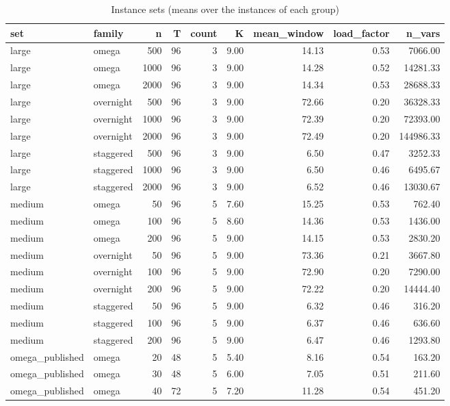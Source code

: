 \begin{table}[htbp]
\centering
\small
\caption{Instance sets (means over the instances of each group)}
\label{tab:instance_sets}
\begin{tabular}{llrrrrrrr}
\toprule
set & family & n & T & count & K & mean\_window & load\_factor & n\_vars \\
\midrule
large & omega & 500 & 96 & 3 & 9.00 & 14.13 & 0.53 & 7066.00 \\
large & omega & 1000 & 96 & 3 & 9.00 & 14.28 & 0.52 & 14281.33 \\
large & omega & 2000 & 96 & 3 & 9.00 & 14.34 & 0.53 & 28688.33 \\
large & overnight & 500 & 96 & 3 & 9.00 & 72.66 & 0.20 & 36328.33 \\
large & overnight & 1000 & 96 & 3 & 9.00 & 72.39 & 0.20 & 72393.00 \\
large & overnight & 2000 & 96 & 3 & 9.00 & 72.49 & 0.20 & 144986.33 \\
large & staggered & 500 & 96 & 3 & 9.00 & 6.50 & 0.47 & 3252.33 \\
large & staggered & 1000 & 96 & 3 & 9.00 & 6.50 & 0.46 & 6495.67 \\
large & staggered & 2000 & 96 & 3 & 9.00 & 6.52 & 0.46 & 13030.67 \\
medium & omega & 50 & 96 & 5 & 7.60 & 15.25 & 0.53 & 762.40 \\
medium & omega & 100 & 96 & 5 & 8.60 & 14.36 & 0.53 & 1436.00 \\
medium & omega & 200 & 96 & 5 & 9.00 & 14.15 & 0.53 & 2830.20 \\
medium & overnight & 50 & 96 & 5 & 9.00 & 73.36 & 0.21 & 3667.80 \\
medium & overnight & 100 & 96 & 5 & 9.00 & 72.90 & 0.20 & 7290.00 \\
medium & overnight & 200 & 96 & 5 & 9.00 & 72.22 & 0.20 & 14444.40 \\
medium & staggered & 50 & 96 & 5 & 9.00 & 6.32 & 0.46 & 316.20 \\
medium & staggered & 100 & 96 & 5 & 9.00 & 6.37 & 0.46 & 636.60 \\
medium & staggered & 200 & 96 & 5 & 9.00 & 6.47 & 0.46 & 1293.80 \\
omega\_published & omega & 20 & 48 & 5 & 5.40 & 8.16 & 0.54 & 163.20 \\
omega\_published & omega & 30 & 48 & 5 & 6.00 & 7.05 & 0.51 & 211.60 \\
omega\_published & omega & 40 & 72 & 5 & 7.20 & 11.28 & 0.54 & 451.20 \\

\end{tabular}
\end{table}
